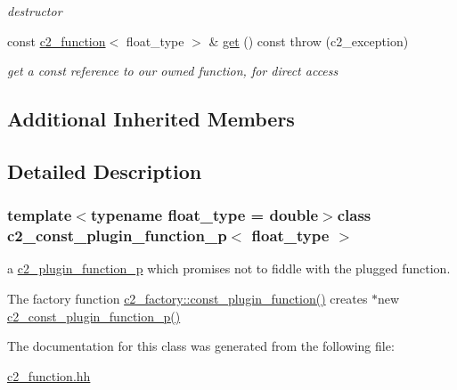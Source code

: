 \begin{DoxyCompactItemize}
\begin{DoxyCompactList}\small\item\em destructor \end{DoxyCompactList}\item 
\hypertarget{classc2__const__plugin__function__p_ad754d7ac308b8ae26a83c61ba2c26df2}{const \hyperlink{classc2__function}{c2\-\_\-function}$<$ float\-\_\-type $>$ \& \hyperlink{classc2__const__plugin__function__p_ad754d7ac308b8ae26a83c61ba2c26df2}{get} () const   throw (c2\-\_\-exception)}\label{classc2__const__plugin__function__p_ad754d7ac308b8ae26a83c61ba2c26df2}

\begin{DoxyCompactList}\small\item\em get a const reference to our owned function, for direct access \end{DoxyCompactList}\end{DoxyCompactItemize}
\subsection*{Additional Inherited Members}


\subsection{Detailed Description}
\subsubsection*{template$<$typename float\-\_\-type = double$>$class c2\-\_\-const\-\_\-plugin\-\_\-function\-\_\-p$<$ float\-\_\-type $>$}

a \hyperlink{classc2__plugin__function__p}{c2\-\_\-plugin\-\_\-function\-\_\-p} which promises not to fiddle with the plugged function.

The factory function \hyperlink{classc2__factory_aebeb20651a347e1fa8f14118faf2588e}{c2\-\_\-factory\-::const\-\_\-plugin\-\_\-function()} creates $\ast$new \hyperlink{classc2__const__plugin__function__p_a443dc7bcbdc6e458673b98aedf53ad56}{c2\-\_\-const\-\_\-plugin\-\_\-function\-\_\-p()} 

The documentation for this class was generated from the following file\-:\begin{DoxyCompactItemize}
\item 
\hyperlink{c2__function_8hh}{c2\-\_\-function.\-hh}\end{DoxyCompactItemize}
